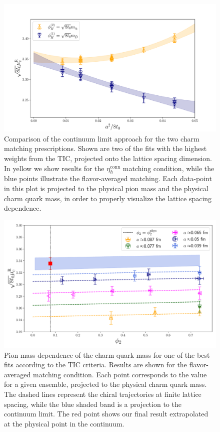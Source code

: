 \begin{figure}
	\centering 
	\includegraphics[scale=0.45]{./cap6/figs/mc/mc_cl_all_cat.pdf}
	\caption{Comparison of the continuum limit approach for the two  charm matching 
	prescriptions. Shown are two of the fits with the highest weights from the TIC, projected onto the lattice 
	spacing dimension. In yellow we show results for the $\eta_h^{\mathrm{conn}}$ matching condition, while  the blue 
	points illustrate  the flavor-averaged matching. Each data-point in this plot is projected to the 
	physical pion mass and the physical charm quark mass, in order to properly visualize the lattice 
	spacing dependence. }
	\label{fig:mc_continuum_limit}
\end{figure}

\begin{figure}
	\centering
	\includegraphics[scale=0.42]{./cap6/figs/mc/fit_phi2_muc_fl_ave.pdf}
	\caption{Pion mass dependence of the charm quark mass for one of the best  fits according to the TIC criteria. Results are shown for the flavor-averaged matching condition. Each point corresponds to the  value for a given ensemble, projected to the physical charm quark mass. The dashed lines represent the chiral trajectories at finite lattice spacing, while the blue shaded band is a projection to the continuum limit. The red point shows our final result extrapolated at the physical point in the continuum. }
	\label{fig:mc_pion_dependence}
\end{figure}


